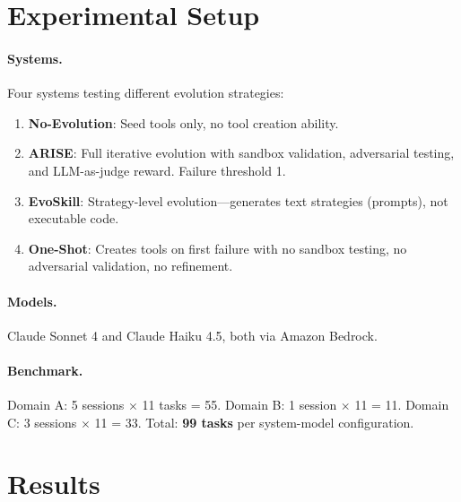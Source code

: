 \documentclass[]{ceurart}
\begin{document}
\section{Experimental Setup}

\paragraph{Systems.} Four systems testing different evolution strategies:
\begin{enumerate}
\item \textbf{No-Evolution}: Seed tools only, no tool creation ability.
\item \textbf{ARISE}: Full iterative evolution with sandbox validation, adversarial testing, and LLM-as-judge reward. Failure threshold 1.
\item \textbf{EvoSkill}: Strategy-level evolution---generates text strategies (prompts), not executable code.
\item \textbf{One-Shot}: Creates tools on first failure with no sandbox testing, no adversarial validation, no refinement.
\end{enumerate}

\paragraph{Models.} Claude Sonnet 4 and Claude Haiku 4.5, both via Amazon Bedrock.

\paragraph{Benchmark.} Domain A: 5 sessions $\times$ 11 tasks = 55. Domain B: 1 session $\times$ 11 = 11. Domain C: 3 sessions $\times$ 11 = 33. Total: \textbf{99 tasks} per system-model configuration.

\section{Results}
\end{document}
